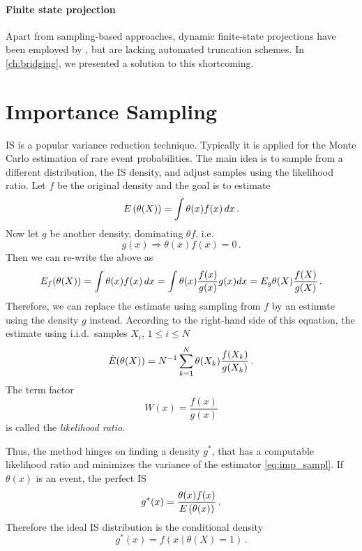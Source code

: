 \paragraph{Finite state projection}
Apart from sampling-based approaches, dynamic finite-state projections have been employed by \citet{mikeev2013numerical}, but are lacking automated truncation schemes.
In \autoref{ch:bridging}, we presented a solution to this shortcoming.

\section{Importance Sampling}
\Acf{IS} is  a popular variance reduction technique.
Typically it is applied for the Monte Carlo estimation of rare event probabilities.
The main idea is to sample from a different distribution, the \ac{IS} density, and adjust samples using the likelihood ratio.
Let $f$ be the original density and the goal is to estimate
\[
    {E}\left(\theta(X)\right) = \int \theta(x)f(x)\,dx\,.
\]
Now let $g$ be another density, dominating $\theta f$, i.e.\ \[g(x)\Rightarrow \theta(x)f(x) = 0\,.\] Then we can re-write the above as
\[
    {E}_f({\theta(X)}) = \int \theta(x)f(x)\,dx = \int \theta(x) \frac{f(x)}{g(x)} g(x) dx = {E}_g \theta(X) \frac{f(X)}{g(X)}\,.
\]
Therefore, we can replace the estimate using sampling from $f$ by an estimate using the density $g$ instead.
According to the right-hand side of this equation, the estimate using i.i.d.\ samples $X_i$, $1\leq i \leq N$
\begin{equation}\label{eq:imp_sampl}
    \hat{{E}}(\theta(X)) = N^{-1} \sum_{k=1}^N \theta(X_k) \frac{f(X_k)}{g(X_k)}\,.
\end{equation}
The term factor
\[
    W(x) = \frac{f(x)}{g(x)}
\]
is called the \emph{likelihood ratio}.

Thus, the method hinges on finding a density $g^{*}$, that has a computable likelihood ratio and  minimizes the variance of the estimator \eqref{eq:imp_sampl}.
If $\theta(x)$ is an event, the perfect \ac{IS} \parencite[Chapter~9.7.1]{kroese2013handbook}
\[
    g^*(x) = \frac{\theta(x) f(x)}{{E}\left(\theta(x)\right)}\,.
\]
Therefore the ideal \ac{IS} distribution is the conditional density
\[
    g^*(x) = f(x \mid \theta(X) = 1)\,.
\]

